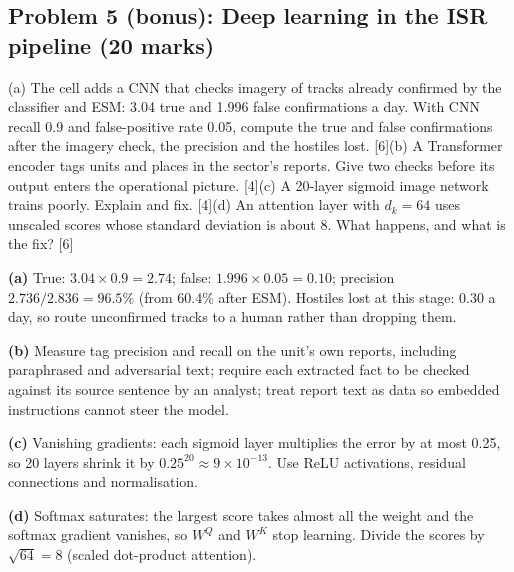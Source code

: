 \documentclass[11pt]{article}
\begin{document}
\subsection{Problem 5 (bonus): Deep learning in the ISR pipeline \normalfont\small\color{GreyN}(20 marks)}

\begin{prob}(a) The cell adds a CNN that checks imagery of tracks already confirmed by the classifier and ESM: 3.04 true and 1.996 false confirmations a day. With CNN recall 0.9 and false-positive rate 0.05, compute the true and false confirmations after the imagery check, the precision and the hostiles lost. [6]\newline (b) A Transformer encoder tags units and places in the sector's reports. Give two checks before its output enters the operational picture. [4]\newline (c) A 20-layer sigmoid image network trains poorly. Explain and fix. [4]\newline (d) An attention layer with $d_k=64$ uses unscaled scores whose standard deviation is about 8. What happens, and what is the fix? [6]\end{prob}

\begin{soln}\textbf{(a)} True: $3.04\times0.9=\mathbf{2.74}$; false: $1.996\times0.05=\mathbf{0.10}$; precision $2.736/2.836=\mathbf{96.5\%}$ (from 60.4\% after ESM). Hostiles lost at this stage: $0.30$ a day, so route unconfirmed tracks to a human rather than dropping them.

\textbf{(b)} Measure tag precision and recall on the unit's own reports, including paraphrased and adversarial text; require each extracted fact to be checked against its source sentence by an analyst; treat report text as data so embedded instructions cannot steer the model.

\textbf{(c)} Vanishing gradients: each sigmoid layer multiplies the error by at most 0.25, so 20 layers shrink it by $0.25^{20}\approx9\times10^{-13}$. Use ReLU activations, residual connections and normalisation.

\textbf{(d)} Softmax saturates: the largest score takes almost all the weight and the softmax gradient vanishes, so $W^Q$ and $W^K$ stop learning. Divide the scores by $\sqrt{64}=8$ (scaled dot-product attention).\end{soln}
\end{document}
